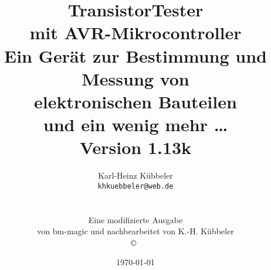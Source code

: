 \documentclass[pdftex,12pt,a4paper,oneside,english]{report}
\DeclareRobustCommand{\_}{\ifmmode{\rule{1ex}{.4pt}}\else\textunderscore\hspace{0pt}\fi}
\begin{document}
\begin{figure}[t]
\end{figure}
\newcommand\electricC{
\hspace{-10pt}
\begin{circuitikz}
\draw(0,0) to[capacitor] (0:1);
\end{circuitikz}
\hspace{-6pt}
}
\newcommand\electricR{
\hspace{-10pt}
\begin{circuitikz}
\draw(0,0) to[european resistor] (0:1);
\end{circuitikz}
\hspace{-6pt}
}
\newcommand\electricL{
\hspace{-10pt}
\begin{circuitikz}
\draw(0,0) 
 to[american inductor] (-1,0);
\end{circuitikz}
\hspace{-6pt}
}
\newcommand\electricDAK{
\begin{circuitikz}
\draw(0,0) to[full diode] (0:1);
\end{circuitikz}
}
\newcommand\electricDKA{
\begin{circuitikz}
\draw(0,0) to[full diode] (180:1);
\end{circuitikz}
}

\title{TransistorTester \\
mit AVR-Mikrocontroller \\
Ein Gerät zur Bestimmung und Messung von\\
elektronischen Bauteilen\\
und ein wenig mehr \dots\\
Version 1.13k \\
}
\author{Karl-Heinz Kübbeler\\
\texttt{kh\_kuebbeler@web.de}
\\
\\
\\
\scriptsize Eine modifizierte Ausgabe\\
\scriptsize von bm-magic und nachbearbeitet von K.-H. Kübbeler\\
\copyright~\\
\vspace*{-0.5cm}
}
\date{\today}
\maketitle
\tableofcontents
\end{document}

